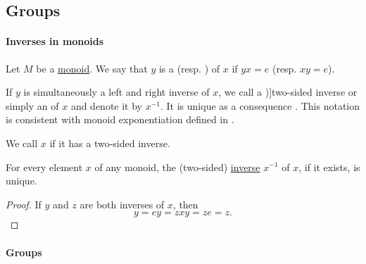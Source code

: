 \subsection{Groups}\label{subsec:groups}

\paragraph{Inverses in monoids}

\begin{definition}\label{def:monoid_inverse}
  Let \( M \) be a \hyperref[def:monoid]{monoid}. We say that \( y \) is a  (resp. ) of \( x \) if \( yx = e \) (resp. \( xy = e \)).

  If \( y \) is simultaneously a left and right inverse of \( x \), we call a \term[ru=двусторонне обратный (\cite[71]{Ляпин1960})]{two-sided inverse} or simply an  of \( x \) and denote it by \( x^{-1} \). It is unique as a consequence . This notation is consistent with monoid exponentiation defined in .

  We call \( x \)  if it has a two-sided inverse.
\end{definition}

\begin{proposition}\label{thm:monoid_inverse_unique}
  For every element \( x \) of any monoid, the (two-sided) \hyperref[def:monoid_inverse]{inverse} \( x^{-1} \) of \( x \), if it exists, is unique.
\end{proposition}
\begin{proof}
  If \( y \) and \( z \) are both inverses of \( x \), then
  \begin{equation*}
    y = ey = zxy = ze = z.
  \end{equation*}
\end{proof}

\paragraph{Groups}

